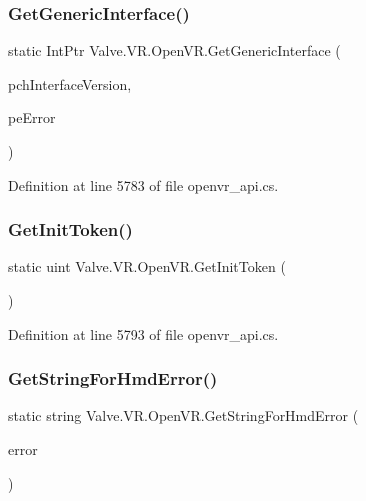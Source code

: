 \subsubsection{\texorpdfstring{GetGenericInterface()}{GetGenericInterface()}}
{\footnotesize\ttfamily static Int\+Ptr Valve.\+V\+R.\+Open\+V\+R.\+Get\+Generic\+Interface (\begin{DoxyParamCaption}\item[{string}]{pch\+Interface\+Version,  }\item[{ref \mbox{\hyperlink{namespace_valve_1_1_v_r_a5d8a20b60549ae5b7668d73452c7e83e}{E\+V\+R\+Init\+Error}}}]{pe\+Error }\end{DoxyParamCaption})\hspace{0.3cm}{\ttfamily [static]}}



Definition at line 5783 of file openvr\+\_\+api.\+cs.

\mbox{\label{class_valve_1_1_v_r_1_1_open_v_r_a54472419f4502be686be5fddc8a69eb9}} 
\subsubsection{\texorpdfstring{GetInitToken()}{GetInitToken()}}
{\footnotesize\ttfamily static uint Valve.\+V\+R.\+Open\+V\+R.\+Get\+Init\+Token (\begin{DoxyParamCaption}{ }\end{DoxyParamCaption})\hspace{0.3cm}{\ttfamily [static]}}



Definition at line 5793 of file openvr\+\_\+api.\+cs.

\mbox{\label{class_valve_1_1_v_r_1_1_open_v_r_a5295773435942add5ec89c21dd8074a3}} 
\subsubsection{\texorpdfstring{GetStringForHmdError()}{GetStringForHmdError()}}
{\footnotesize\ttfamily static string Valve.\+V\+R.\+Open\+V\+R.\+Get\+String\+For\+Hmd\+Error (\begin{DoxyParamCaption}\item[{\mbox{\hyperlink{namespace_valve_1_1_v_r_a5d8a20b60549ae5b7668d73452c7e83e}{E\+V\+R\+Init\+Error}}}]{error }\end{DoxyParamCaption})\hspace{0.3cm}{\ttfamily [static]}}



